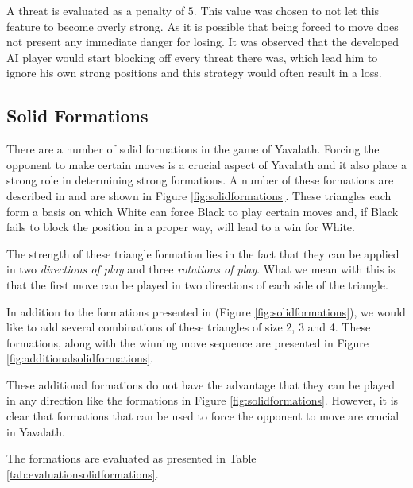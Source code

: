 \documentclass[11pt]{article}
\begin{document}


A threat is evaluated as a penalty of $5$. This value was chosen to not let this feature to become overly strong. As it is possible that being forced to move does not present any immediate danger for losing. It was observed that the developed AI player would start blocking off every threat there was, which lead him to ignore his own strong positions and this strategy would often result in a loss.

\subsection{Solid Formations}
\label{-subsec:solidformations}
There are a number of solid formations in the game of Yavalath. Forcing the opponent to make certain moves is a crucial aspect of Yavalath and it also place a strong role in determining strong formations. A number of these formations are described in \cite{browne2011evolutionary} and are shown in Figure \ref{fig:solidformations}. These triangles each form a basis on which White can force Black to play certain moves and, if Black fails to block the position in a proper way, will lead to a win for White.



The strength of these triangle formation lies in the fact that they can be applied in two \emph{directions of play} and three \emph{rotations of play}. What we mean with this is that the first move can be played in two directions of each side of the triangle.

In addition to the formations presented in \cite{browne2011evolutionary} (Figure \ref{fig:solidformations}), we would like to add several combinations of these triangles of size 2, 3 and 4. These formations, along with the winning move sequence are presented in Figure \ref{fig:additionalsolidformations}.



These additional formations do not have the advantage that they can be played in any direction like the formations in Figure \ref{fig:solidformations}. However, it is clear that formations that can be used to force the opponent to move are crucial in Yavalath.

The formations are evaluated as presented in Table \ref{tab:evaluationsolidformations}.


\end{document}
